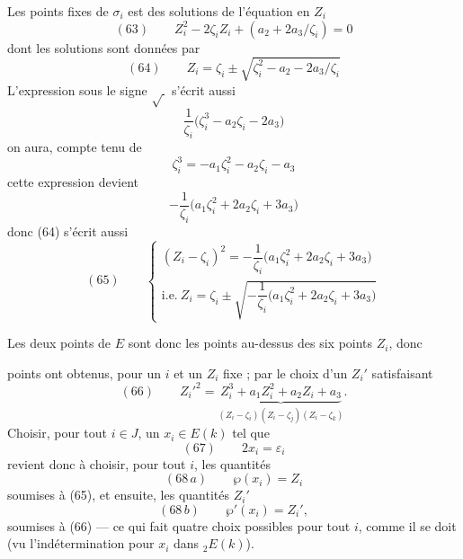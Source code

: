 \documentclass[11pt,a4paper]{article}
\begin{document}
Les  points fixes de $\sigma_i$
est  des solutions de l'équation en $Z_i$
\[
  (63) \qquad Z_i^2 - 2\zeta_i Z_i + (a_2 + 2a_3/\zeta_i) = 0
\]
dont les solutions sont données par
\[
  (64) \qquad Z_i = \zeta_i \pm \sqrt{\zeta_i^2 - a_2 - 2a_3/\zeta_i}
\]
L'expression sous le signe $\sqrt{\ }$ s'écrit aussi
\[
  \frac{1}{\zeta_i}\bigl(\zeta_i^3 - a_2 \zeta_i - 2a_3\bigr)
\]
on aura, compte tenu de 
\[
  \zeta_i^3 = -a_1 \zeta_i^2 - a_2 \zeta_i - a_3
\]
 cette expression devient
\[
  -\frac{1}{\zeta_i}\bigl(a_1 \zeta_i^2 + 2a_2 \zeta_i + 3a_3\bigr)
\]
donc (64) s'écrit aussi
\[
  (65) \qquad
  \begin{cases}
    (Z_i - \zeta_i)^2 = -\dfrac{1}{\zeta_i}\bigl(a_1 \zeta_i^2 + 2a_2 \zeta_i + 3a_3\bigr) \\[2ex]
    \text{i.e.}\ Z_i = \zeta_i \pm \sqrt{-\dfrac{1}{\zeta_i}\bigl(a_1 \zeta_i^2 + 2a_2 \zeta_i + 3a_3\bigr)}
  \end{cases}
\]

Les deux points  de $E$ sont donc les points au-dessus des six
points $Z_i$, donc  

points ont obtenus, pour un $i$ et un $Z_i$ fixe ; par le choix d'un $Z_i'$
satisfaisant
\[
  (66) \qquad Z_i'^2 = \underbrace{Z_i^3 + a_1 Z_i^2 + a_2 Z_i + a_3}_{(Z_i - \zeta_i)(Z_i - \zeta_j)(Z_i - \zeta_k)} .
\]
Choisir, pour tout $i \in J$, un $x_i \in E(k)$ tel que
\[
  (67) \qquad 2x_i = \varepsilon_i
\]
revient donc à choisir, pour tout $i$, les quantités
\[
  (68\,a) \qquad \wp(x_i) = Z_i
\]
soumises à (65),  et ensuite, les quantités $Z_i'$
\[
  (68\,b) \qquad \wp'(x_i) = Z_i' ,
\]
soumises à (66) --- ce qui fait quatre choix possibles pour tout $i$, comme il se
doit (vu l'indétermination pour $x_i$ dans ${}_2E(k)$).
\end{document}
